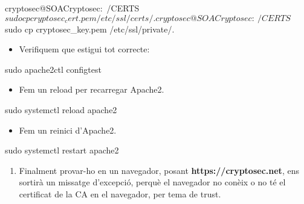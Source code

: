 \documentclass[]{article}
\newenvironment{Shaded}{}{}
\newcommand{\ExtensionTok}[1]{#1}
\newcommand{\FunctionTok}[1]{\textcolor[rgb]{0.02,0.16,0.49}{#1}}
\newcommand{\NormalTok}[1]{#1}
\providecommand{\tightlist}{%
  \setlength{\itemsep}{0pt}\setlength{\parskip}{0pt}}
\begin{document}
\begin{Shaded}
\begin{Highlighting}[]
\ExtensionTok{cryptosec@SOACryptosec}\NormalTok{:~/CERTS$ sudo cp cryptosec_cert.pem /etc/ssl/certs/.}
\ExtensionTok{cryptosec@SOACryptosec}\NormalTok{:~/CERTS$ sudo cp cryptosec_key.pem /etc/ssl/private/.}
\end{Highlighting}
\end{Shaded}

\begin{itemize}
\tightlist
\item
  Verifiquem que estigui tot correcte:
\end{itemize}

\begin{Shaded}
\begin{Highlighting}[]
\FunctionTok{sudo}\NormalTok{ apache2ctl configtest}
\end{Highlighting}
\end{Shaded}

\begin{itemize}
\tightlist
\item
  Fem un reload per recarregar Apache2.
\end{itemize}

\begin{Shaded}
\begin{Highlighting}[]
\FunctionTok{sudo}\NormalTok{ systemctl reload apache2}
\end{Highlighting}
\end{Shaded}

\begin{itemize}
\tightlist
\item
  Fem un reinici d'Apache2.
\end{itemize}

\begin{Shaded}
\begin{Highlighting}[]
\FunctionTok{sudo}\NormalTok{ systemctl restart apache2}
\end{Highlighting}
\end{Shaded}

\begin{enumerate}
\def\labelenumi{\arabic{enumi}.}
\setcounter{enumi}{3}
\tightlist
\item
  Finalment provar-ho en un navegador, posant
  \textbf{https://cryptosec.net}, ens sortirà un missatge d'excepció,
  perquè el navegador no conèix o no té el certificat de la CA en el
  navegador, per tema de trust.
\end{enumerate}
\end{document}
